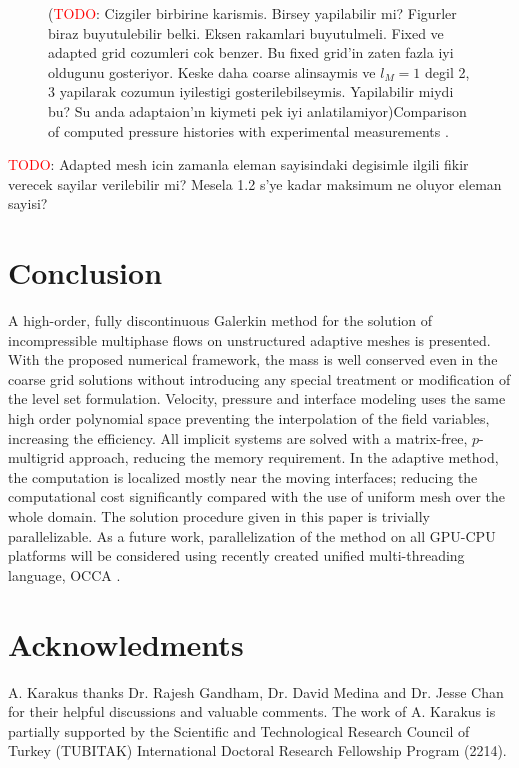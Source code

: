 \documentclass[11pt,a4paper,twoside]{article}
\begin{document}
\begin{figure}[ht!]
\begin{center}
		\end{center}
		\caption{(\textcolor{red}{TODO}: Cizgiler birbirine karismis. Birsey yapilabilir mi? Figurler biraz buyutulebilir belki. Eksen rakamlari buyutulmeli. Fixed ve adapted grid cozumleri cok benzer. Bu fixed grid'in zaten fazla iyi oldugunu gosteriyor. Keske daha coarse alinsaymis ve $ l_M = 1 $ degil 2, 3 yapilarak cozumun iyilestigi gosterilebilseymis. Yapilabilir miydi bu? Su anda adaptaion'ın kiymeti pek iyi anlatilamiyor)Comparison of computed pressure histories with experimental measurements \cite{SPHERIC}.}
		\label{Fig:3DDamBreakPressure}
	\end{figure}
	
	\textcolor{red}{TODO}: Adapted mesh icin zamanla eleman sayisindaki degisimle ilgili fikir verecek sayilar verilebilir mi? Mesela 1.2 s'ye kadar maksimum ne oluyor eleman sayisi?
	
	
	
	
	\section{Conclusion}
	A high-order, fully discontinuous Galerkin method for the solution of incompressible multiphase flows on unstructured adaptive meshes is presented. With the proposed numerical framework, the mass is well conserved even in the coarse grid solutions without introducing any special treatment or modification of the level set formulation. Velocity, pressure and interface modeling uses the same high order polynomial space preventing the interpolation of the field variables, increasing the efficiency. All implicit systems are solved with a matrix-free, $ p $-multigrid approach, reducing the memory requirement. In the adaptive method, the computation is localized mostly near the moving interfaces; reducing the computational cost significantly compared with the use of uniform mesh over the whole domain. The solution procedure given in this paper is trivially parallelizable. As a future work, parallelization of the method on all GPU-CPU platforms will be considered using recently created unified multi-threading language, OCCA \cite{medina_occa:_2014}.  
	
	
	
	
	
	\section{Acknowledments}
	A. Karakus thanks Dr. Rajesh Gandham, Dr. David Medina and Dr. Jesse Chan for their helpful discussions and valuable comments. The work of A. Karakus is partially supported by the Scientific and Technological Research Council of Turkey (TUBITAK) International Doctoral Research Fellowship Program (2214).
	
	 
	
\end{document}
